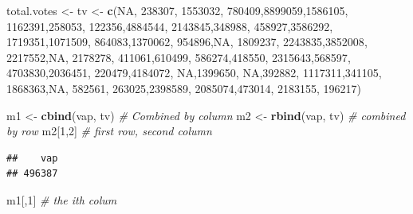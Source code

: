 \documentclass[]{article}
\newenvironment{Shaded}{\begin{snugshade}}{\end{snugshade}}
\newcommand{\KeywordTok}[1]{\textcolor[rgb]{0.13,0.29,0.53}{\textbf{#1}}}
\newcommand{\DecValTok}[1]{\textcolor[rgb]{0.00,0.00,0.81}{#1}}
\newcommand{\StringTok}[1]{\textcolor[rgb]{0.31,0.60,0.02}{#1}}
\newcommand{\CommentTok}[1]{\textcolor[rgb]{0.56,0.35,0.01}{\textit{#1}}}
\newcommand{\OtherTok}[1]{\textcolor[rgb]{0.56,0.35,0.01}{#1}}
\newcommand{\NormalTok}[1]{#1}
\begin{document}
\begin{Shaded}
\begin{Highlighting}[]
\NormalTok{total.votes <-}\StringTok{ }\NormalTok{tv <-}\StringTok{ }\KeywordTok{c}\NormalTok{(}\OtherTok{NA}\NormalTok{, }\DecValTok{238307}\NormalTok{, }\DecValTok{1553032}\NormalTok{, }\DecValTok{780409}\NormalTok{,}\DecValTok{8899059}\NormalTok{,}\DecValTok{1586105}\NormalTok{, }\DecValTok{1162391}\NormalTok{,}\DecValTok{258053}\NormalTok{, }\DecValTok{122356}\NormalTok{,}\DecValTok{4884544}\NormalTok{, }\DecValTok{2143845}\NormalTok{,}\DecValTok{348988}\NormalTok{, }\DecValTok{458927}\NormalTok{,}\DecValTok{3586292}\NormalTok{, }\DecValTok{1719351}\NormalTok{,}\DecValTok{1071509}\NormalTok{, }\DecValTok{864083}\NormalTok{,}\DecValTok{1370062}\NormalTok{, }\DecValTok{954896}\NormalTok{,}\OtherTok{NA}\NormalTok{, }\DecValTok{1809237}\NormalTok{, }\DecValTok{2243835}\NormalTok{,}\DecValTok{3852008}\NormalTok{, }\DecValTok{2217552}\NormalTok{,}\OtherTok{NA}\NormalTok{, }\DecValTok{2178278}\NormalTok{, }\DecValTok{411061}\NormalTok{,}\DecValTok{610499}\NormalTok{, }\DecValTok{586274}\NormalTok{,}\DecValTok{418550}\NormalTok{, }\DecValTok{2315643}\NormalTok{,}\DecValTok{568597}\NormalTok{, }\DecValTok{4703830}\NormalTok{,}\DecValTok{2036451}\NormalTok{, }\DecValTok{220479}\NormalTok{,}\DecValTok{4184072}\NormalTok{, }\OtherTok{NA}\NormalTok{,}\DecValTok{1399650}\NormalTok{, }\OtherTok{NA}\NormalTok{,}\DecValTok{392882}\NormalTok{, }\DecValTok{1117311}\NormalTok{,}\DecValTok{341105}\NormalTok{, }\DecValTok{1868363}\NormalTok{,}\OtherTok{NA}\NormalTok{, }\DecValTok{582561}\NormalTok{, }\DecValTok{263025}\NormalTok{,}\DecValTok{2398589}\NormalTok{, }\DecValTok{2085074}\NormalTok{,}\DecValTok{473014}\NormalTok{, }\DecValTok{2183155}\NormalTok{, }\DecValTok{196217}\NormalTok{)}

\NormalTok{m1 <-}\StringTok{ }\KeywordTok{cbind}\NormalTok{(vap, tv) }\CommentTok{# Combined by column}
\NormalTok{m2 <-}\StringTok{ }\KeywordTok{rbind}\NormalTok{(vap, tv) }\CommentTok{# combined by row}
\NormalTok{m2[}\DecValTok{1}\NormalTok{,}\DecValTok{2}\NormalTok{] }\CommentTok{# first row, second column}
\end{Highlighting}
\end{Shaded}

\begin{verbatim}
##    vap 
## 496387
\end{verbatim}

\begin{Shaded}
\begin{Highlighting}[]
\NormalTok{m1[,}\DecValTok{1}\NormalTok{] }\CommentTok{# the ith colum}
\end{Highlighting}
\end{Shaded}
\end{document}
